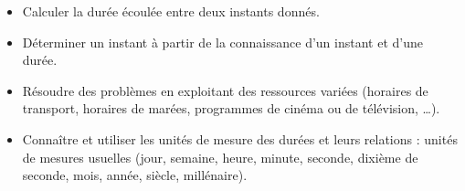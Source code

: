\begin{prerequis}
    \begin{itemize}        
        \item[\emoji{diamond-suit}] Calculer la durée écoulée entre deux instants donnés.
        \item[\emoji{diamond-suit}] Déterminer un instant à partir de la connaissance d’un instant et d’une durée.                
        \item[\emoji{diamond-suit}] Résoudre des problèmes en exploitant des ressources variées (horaires de transport, horaires de marées, programmes de cinéma ou de télévision, \dots).        
        \columnbreak
        \item[\emoji{red-heart}] Connaître et utiliser les unités de mesure des durées et leurs relations : unités de mesures usuelles (jour, semaine, heure, minute, seconde, dixième de seconde, mois, année, siècle, millénaire).
    \end{itemize}
\end{prerequis}
